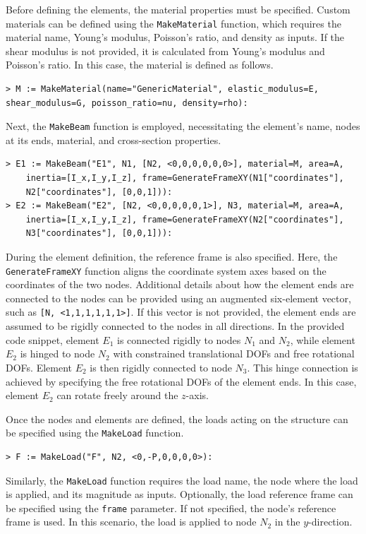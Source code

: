 Before defining the elements, the material properties must be specified. Custom materials can be defined using the \texttt{MakeMaterial} function, which requires the material name, Young's modulus, Poisson's ratio, and density as inputs. If the shear modulus is not provided, it is calculated from Young's modulus and Poisson's ratio. In this case, the material is defined as follows.
%
\begin{verbatim}
> M := MakeMaterial(name="GenericMaterial", elastic_modulus=E,
shear_modulus=G, poisson_ratio=nu, density=rho):
\end{verbatim}
%
Next, the \texttt{MakeBeam} function is employed, necessitating the element's name, nodes at its ends, material, and cross-section properties.
%
\begin{verbatim}
> E1 := MakeBeam("E1", N1, [N2, <0,0,0,0,0,0>], material=M, area=A,
    inertia=[I_x,I_y,I_z], frame=GenerateFrameXY(N1["coordinates"],
    N2["coordinates"], [0,0,1])):
> E2 := MakeBeam("E2", [N2, <0,0,0,0,0,1>], N3, material=M, area=A,
    inertia=[I_x,I_y,I_z], frame=GenerateFrameXY(N2["coordinates"],
    N3["coordinates"], [0,0,1])):
\end{verbatim}
%
During the element definition, the reference frame is also specified. Here, the \texttt{GenerateFrameXY} function aligns the coordinate system axes based on the coordinates of the two nodes. Additional details about how the element ends are connected to the nodes can be provided using an augmented six-element vector, such as \texttt{[N, <1,1,1,1,1,1>]}. If this vector is not provided, the element ends are assumed to be rigidly connected to the nodes in all directions. In the provided code snippet, element $E_1$ is connected rigidly to nodes $N_1$ and $N_2$, while element $E_2$ is hinged to node $N_2$ with constrained translational \acp{DOF} and free rotational \acp{DOF}. Element $E_2$ is then rigidly connected to node $N_3$. This hinge connection is achieved by specifying the free rotational \acp{DOF} of the element ends. In this case, element $E_2$ can rotate freely around the $z$-axis.

Once the nodes and elements are defined, the loads acting on the structure can be specified using the \texttt{MakeLoad} function.
%
\begin{verbatim}
> F := MakeLoad("F", N2, <0,-P,0,0,0,0>):
\end{verbatim}
%
Similarly, the \texttt{MakeLoad} function requires the load name, the node where the load is applied, and its magnitude as inputs. Optionally, the load reference frame can be specified using the \texttt{frame} parameter. If not specified, the node's reference frame is used. In this scenario, the load is applied to node $N_2$ in the $y$-direction.

